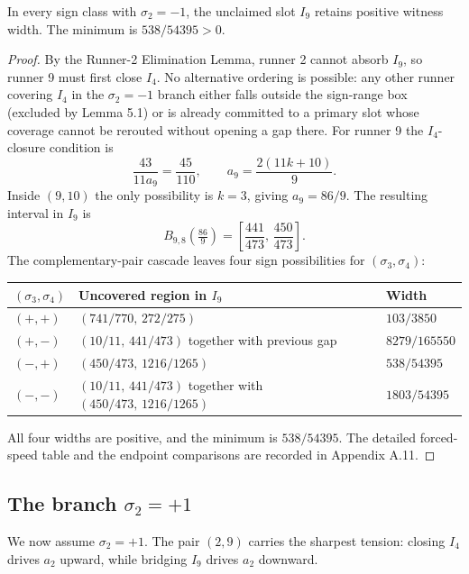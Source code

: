 \documentclass[12pt]{article}
\begin{document}
\begin{lemma}\label{l:62}
In every sign class with $\sigma_2=-1$, the
unclaimed slot $I_9$ retains positive witness width. The minimum is $538/54395>0$.

\end{lemma}
\begin{proof}
By the Runner-2 Elimination Lemma, runner 2 cannot absorb $I_9$, so runner 9 must first
close $I_4$. No alternative ordering is possible: any other runner covering $I_4$ in the
$\sigma_2=-1$ branch either falls outside the sign-range box (excluded by Lemma 5.1) or is
already committed to a primary slot whose coverage cannot be rerouted without opening a gap
there. For runner 9 the $I_4$-closure condition is
\[
\frac{43}{11a_9} = \frac{45}{110},\qquad a_9 = \frac{2(11k+10)}{9}.
\]
Inside $(9,10)$ the only possibility is $k=3$, giving $a_9=86/9$. The resulting interval
in $I_9$ is
\[
B_{9,8}\!\left(\tfrac{86}{9}\right)
  = \left[\frac{441}{473},\,\frac{450}{473}\right].
\]
The complementary-pair cascade leaves four sign possibilities for $(\sigma_3,\sigma_4)$:

\begin{center}
\begin{tabular}{@{}lll@{}}
\toprule
$(\sigma_3,\sigma_4)$ & Uncovered region in $I_9$ & Width \\
\midrule
$(+,+)$ & $(741/770,\,272/275)$ & $103/3850$ \\
$(+,-)$ & $(10/11,\,441/473)$ together with previous gap & $8279/165550$ \\
$(-,+)$ & $(450/473,\,1216/1265)$ & $538/54395$ \\
$(-,-)$ & $(10/11,\,441/473)$ together with $(450/473,\,1216/1265)$ & $1803/54395$ \\
\bottomrule
\end{tabular}
\end{center}

All four widths are positive, and the minimum is $538/54395$. The detailed forced-speed
table and the endpoint comparisons are recorded in Appendix A.11.
\end{proof}

\subsection{The branch \texorpdfstring{$\sigma_2=+1$}{sigma\_2 = +1}}

We now assume $\sigma_2=+1$. The pair $(2,9)$ carries the sharpest tension: closing $I_4$
drives $a_2$ upward, while bridging $I_9$ drives $a_2$ downward.
\end{document}
